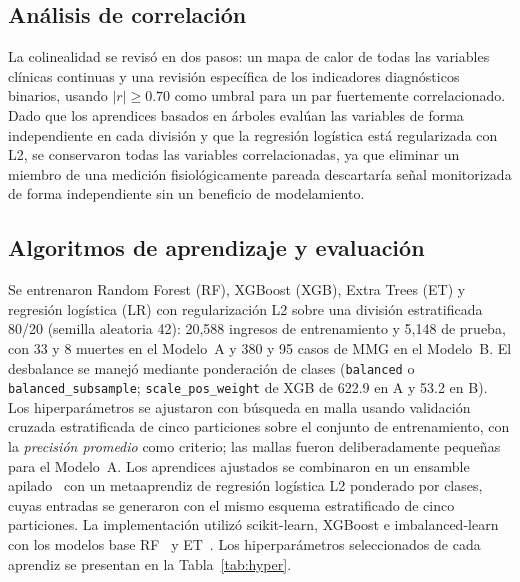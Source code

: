 \documentclass[healthcare,article,submit,pdftex,moreauthors]{Definitions/mdpi_es}
\begin{document}
\subsection{Análisis de correlación}
La colinealidad se revisó en dos pasos: un mapa de calor de todas las variables clínicas
continuas y una revisión específica de los indicadores diagnósticos binarios, usando
$|r|\geq 0.70$ como umbral para un par fuertemente correlacionado. Dado que los aprendices
basados en árboles evalúan las variables de forma independiente en cada división y que la
regresión logística está regularizada con L2, se conservaron todas las variables
correlacionadas, ya que eliminar un miembro de una medición fisiológicamente pareada
descartaría señal monitorizada de forma independiente sin un beneficio de modelamiento.

\subsection{Algoritmos de aprendizaje y evaluación}
Se entrenaron Random Forest (RF), XGBoost (XGB), Extra Trees (ET) y regresión logística (LR)
con regularización L2 sobre una división estratificada 80/20 (semilla aleatoria 42):
20{,}588 ingresos de entrenamiento y 5{,}148 de prueba, con 33 y 8 muertes en el Modelo~A y
380 y 95 casos de MMG en el Modelo~B. El desbalance se manejó mediante ponderación de clases
(\texttt{balanced} o \texttt{balanced\_subsample}; \texttt{scale\_pos\_weight} de XGB de
622.9 en A y 53.2 en B). Los hiperparámetros se ajustaron con búsqueda en malla usando
validación cruzada estratificada de cinco particiones sobre el conjunto de entrenamiento, con
la \emph{precisión promedio} como criterio; las mallas fueron deliberadamente pequeñas para el
Modelo~A. Los aprendices ajustados se combinaron en un ensamble apilado~\cite{Wolpert1992Stacking}
con un metaaprendiz de regresión logística L2 ponderado por clases, cuyas entradas se generaron
con el mismo esquema estratificado de cinco particiones. La implementación utilizó scikit-learn,
XGBoost e imbalanced-learn~\cite{Pedregosa2011sklearn,Chen2016XGBoost,Chawla2002SMOTE}
con los modelos base RF~\cite{Breiman2001RF} y ET~\cite{Geurts2006ExtraTrees}. Los hiperparámetros seleccionados de cada aprendiz se presentan en la Tabla~\ref{tab:hyper}.
\end{document}
